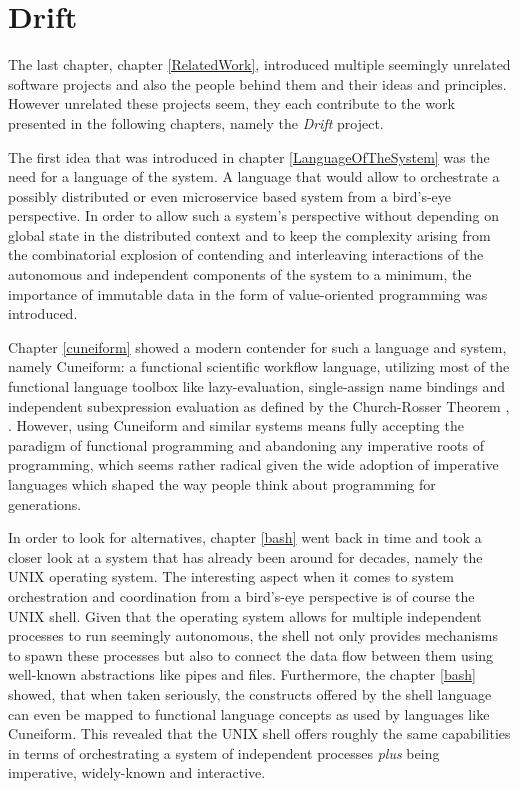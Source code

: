 \section{Drift}
\label{driftintro}

The last chapter, chapter \ref{RelatedWork}, introduced multiple
seemingly unrelated software projects and also the people behind
them and their ideas and principles. However unrelated these projects seem,
they each contribute to the work presented in the following
chapters, namely the \textit{Drift} project.

The first idea that was introduced in chapter \ref{LanguageOfTheSystem}
was the need for a language of the system. A language that would allow
to orchestrate a possibly distributed or even microservice based system
from a bird's-eye perspective. In order to allow such a system's
perspective without depending on global state in the distributed
context and to keep the complexity arising from the combinatorial
explosion of contending and interleaving interactions of the
autonomous and independent components of the system to a minimum,
the importance of immutable data in the form of value-oriented
programming was introduced.

Chapter \ref{cuneiform} showed a modern contender for such a
language and system, namely Cuneiform: a functional scientific
workflow language, utilizing most of the functional language
toolbox like lazy-evaluation, single-assign name bindings and
independent subexpression evaluation as defined by the
Church-Rosser Theorem \cite{churchrosser}, \cite{churchrosserwiki}.
However, using Cuneiform and similar systems means fully accepting
the paradigm of functional programming and abandoning any
imperative roots of programming, which seems rather radical given
the wide adoption of imperative languages which shaped the
way people think about programming for generations.

In order to look for alternatives, chapter \ref{bash} went back
in time and took a closer look at a system that has already been
around for decades, namely the UNIX operating system. The interesting
aspect when it comes to system orchestration and coordination from
a bird's-eye perspective is of course the UNIX shell. Given
that the operating system allows for multiple independent
processes to run seemingly autonomous, the shell not only provides
mechanisms to spawn these processes but also to connect
the data flow between them using well-known abstractions like pipes
and files. Furthermore, the chapter \ref{bash} showed, that when taken
seriously, the constructs offered by the shell language can even
be mapped to functional language concepts as used by languages
like Cuneiform. This revealed that the UNIX shell offers roughly
the same capabilities in terms of orchestrating a system of
independent processes \textit{plus} being imperative, widely-known
and interactive.

